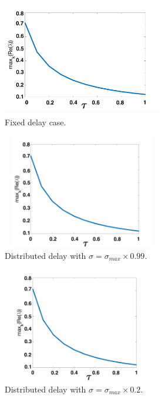 \documentclass[12pt]{report}
\begin{document}
\begin{figure}[H]
    \centering
    \begin{subfigure}[b]{0.45\textwidth}
        \centering
        \includegraphics[width=7cm,height=5cm]{p2fixed.png}
        \caption{Fixed delay case.}
        \label{}
    \end{subfigure}
    \hfill
    \begin{subfigure}[b]{0.45\textwidth}
        \centering
        \includegraphics[width=7cm,height=5cm]{p2sigmax.png}
        \caption{Distributed delay with $\sigma=\sigma_{max}\times0.99$.}
        \label{}
    \end{subfigure}
    \hfill
    \begin{subfigure}[b]{0.45\textwidth}
        \centering
        \includegraphics[width=7cm,height=5cm]{p2sigmax5.png}
        \caption{Distributed delay with $\sigma=\sigma_{max}\times0.2$.}
        \label{}
    \end{subfigure}
    \hfill
    \begin{subfigure}[b]{0.45\textwidth}
        \centering

\end{subfigure}
\end{figure}
\end{document}
